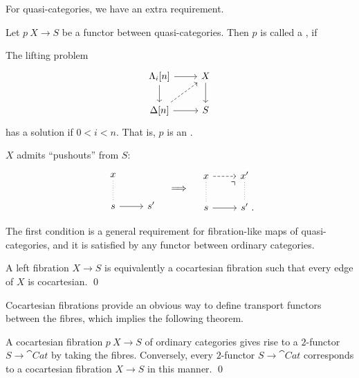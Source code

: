 For quasi-categories, we have an extra requirement.

\begin{definition}
    Let $p\:X\to S$ be a functor between quasi-categories.
    Then $p$ is called a , if
    \begin{itms}
        \item The lifting problem 
        \[\begin{tikzcd}
            \Lambda_i[n] \ar[d] \ar[r] & X \ar[d] \\
            \Delta[n] \ar[r] \ar[ur,dashed] & S
        \end{tikzcd}\]
        has a solution if $0<i<n$. That is, $p$ is an .
        \item $X$ admits ``pushouts'' from $S$:
        \[\begin{tikzcd}
            x\ar[d,dotted,dash] \\
            s \ar[r] & s'
        \end{tikzcd}\quad\Longrightarrow\quad\begin{tikzcd}
            x\ar[r,dashed]\ar[d,dotted,dash] & x'\ar[d,dotted,dash] \\
            s \ar[r]\ar[ur,phantom,end anchor=south west,very near end,"\urcorner"] & s'\rlap{\ .}
        \end{tikzcd}\]
    \end{itms}
\end{definition}

The first condition is a general requirement for fibration-like maps of quasi-categories,
and it is satisfied by any functor between ordinary categories.

\begin{proposition}
    A left fibration $X\to S$ is equivalently a cocartesian fibration
    such that every edge of $X$ is cocartesian. \qed
\end{proposition}

Cocartesian fibrations provide an obvious way to 
define transport functors between the fibres,
which implies the following theorem.

\begin{theorem}
    A cocartesian fibration $p\:X\to S$ of ordinary categories
    gives rise to a $2$-functor $S\to\cat{Cat}$ by taking the fibres.
    Conversely, every $2$-functor $S\to\cat{Cat}$
    corresponds to a cocartesian fibration $X\to S$ in this manner. \qed
\end{theorem}

